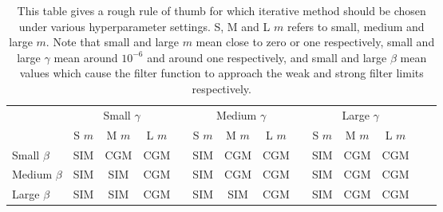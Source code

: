 \begin{table}[h]
    \centering
    \footnotesize
    \def\arraystretch{1.5}
    \begin{tabular}{@{}lccccccccccccc@{}}
    \toprule
    & \multicolumn{3}{c}{Small $\gamma$} & \phantom{ab} & \multicolumn{3}{c}{Medium $\gamma$} & \phantom{ab} & \multicolumn{3}{c}{Large $\gamma$} \\
    \cmidrule{2-4} \cmidrule{6-8} \cmidrule{10-12}
    & S $m$   & M $m$  & L $m$ &&  S $m$   & M $m$  & L $m$ && S $m$   & M $m$  & L $m$ && \\ \midrule \rule{0pt}{1cm}
    Small $\beta$  & SIM & CGM & CGM && SIM & CGM & CGM &&  SIM & CGM & CGM    \\ \rule{0pt}{6ex}
    Medium $\beta$ & SIM & SIM & CGM && SIM & CGM & CGM &&  SIM & CGM & CGM    \\ \rule{0pt}{6ex}
    Large $\beta$  & SIM & SIM & CGM && SIM & SIM & CGM &&  SIM & CGM & CGM   \\[0.5cm] \bottomrule 
    \end{tabular}
    \caption{This table gives a rough rule of thumb for which iterative method should be chosen under various hyperparameter settings. S, M and L $m$ refers to small, medium and large $m$. Note that small and large $m$ mean close to zero or one respectively, small and large $\gamma$ mean around $10^{-6}$ and around one respectively, and small and large $\beta$ mean values which cause the filter function to approach the weak and strong filter limits respectively. }
    \label{tab:decision_SIM_CGM} 
\end{table}




 






\newpage


